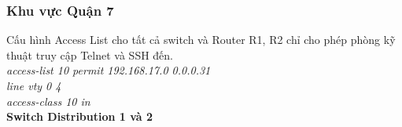 \documentclass[a4paper, 12pt]{article}
\begin{document}
\subsubsection{Khu vực Quận 7}
\hspace*{1cm}Cấu hình Access List cho tất cả switch và Router R1, R2 chỉ cho phép phòng kỹ thuật truy cập Telnet và SSH đến.\\
\hspace*{2cm}\textit{access-list 10 permit 192.168.17.0 0.0.0.31\\
\hspace*{2cm}line vty 0 4\\
\hspace*{2cm}access-class 10 in\\}
\hspace*{1cm}\textbf{Switch Distribution 1 và 2}\\
\end{document}
